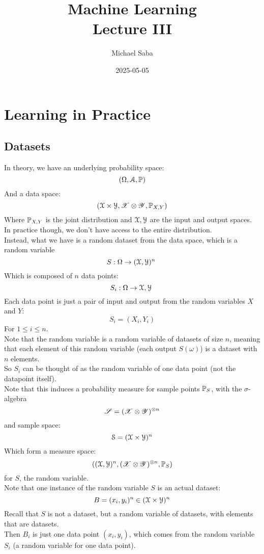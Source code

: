 \documentclass[12pt]{article}
\title{%
    \Huge Machine Learning \\
    \Large Lecture III
}
\date{2025-05-05}
\author{Michael Saba}
\begin{document}
\maketitle
\newpage
\setlength{\parindent}{0pt}

\section*{Learning in Practice}

\subsection*{Datasets}

In theory, we have an underlying
probability space:
\[ (\Omega, \mathcal{A}, \mathbb{P}) \]
And a data space:
\[(\mathcal{X}\times \mathcal{Y}, \mathscr{X} \otimes \mathscr{Y}, 
\mathbb{P}_{X, Y})\]
Where $\mathbb{P}_{X, Y}$ is the joint distribution 
and $\mathcal{X}, \mathcal{Y}$
are the input and output spaces. \\

In practice though, we don't have access
to the entire distribution. \\

Instead, what we have is a random dataset
from the data space,
which is a random variable
\[ S: \Omega \to (\mathcal{X}, \mathcal{Y})^n \ \]
Which is composed of $n$ data points:
\[ S_i: \Omega \to \xcal, \ycal\ \]
Each data point is just a pair
of input and output from the random
variables $X$ and $Y$:
\[ S_i = (X_i, Y_i)\]
For $1 \leq i \leq n$. \\

Note that the random variable is
a random variable of datasets of size $n$,
meaning that each element of this
random variable (each output $S(\omega)$)
is a dataset with $n$ elements. \\

So $S_i$ can be thought of as the random
variable of one data point
(not the datapoint itself). \\

Note that this induces a probability
measure for sample points $\mathbb{P}_S$,
with the $\sigma$-algebra
\[ \mathscr{S} = (\mathscr{X} \otimes \mathscr{Y})^{\otimes n} \]
and sample space:
\[ \mathcal{S} = (\mathcal{X} \times \mathcal{Y})^n \]
Which form a measure space:
\[ ((\mathcal{X}, \mathcal{Y})^n,
(\mathscr{X} \otimes \mathscr{Y})^{\otimes n}, \mathbb{P}_S) \]
for $S$, the random variable. \\

Note that one instance of the random variable $S$
is an actual dataset:
\[ B = (x_i, y_i)^n 
\in (\mathcal{X}\times \mathcal{Y})^n \]
Recall that $S$ is not a dataset,
but a random variable of datasets,
with elements that are datasets. \\
Then $B_i$ is just one data point $(x_i, y_i)$,
which comes from the random variable
$S_i$ (a random variable for one data point). \\
\end{document}
